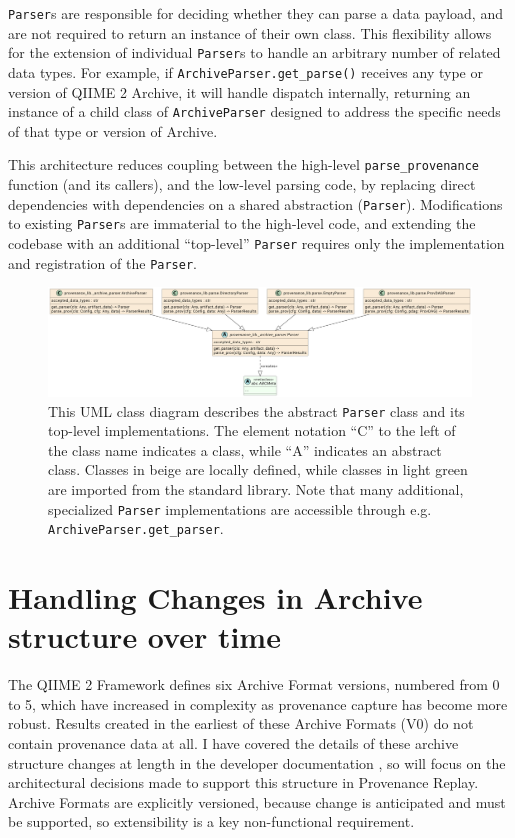 \texttt{Parser}s are responsible for deciding whether they can parse a data payload, and
are not required to return an instance of their own class. This flexibility
allows for the extension of individual \texttt{Parser}s to handle an arbitrary number of
related data types. For example, if \texttt{ArchiveParser.get\_parse()} receives any type
or version of QIIME 2 Archive, it will handle dispatch internally, returning an
instance of a child class of \texttt{ArchiveParser} designed to address the specific
needs of that type or version of Archive.

This architecture reduces coupling between the high-level \texttt{parse\_provenance}
function (and its callers), and the low-level parsing code, by replacing direct
dependencies with dependencies on a shared abstraction (\texttt{Parser}). Modifications
to existing \texttt{Parser}s are immaterial to the high-level code, and extending the
codebase with an additional “top-level” \texttt{Parser} requires only the implementation
and registration of the \texttt{Parser}. 

\begin{figure}[htp]
\centering
\includegraphics[width=\textwidth]{figures/allParsersUML.png}
\caption[UML Class diagram of the abstract Parser class and its implementations]%
{This UML class diagram describes the abstract \texttt{Parser} class and its top-level
implementations. The element notation “C” to the left of the class name
indicates a class, while “A” indicates an abstract class. Classes in beige are
locally defined, while classes in light green are imported from the standard
library. Note that many additional, specialized \texttt{Parser} implementations are
accessible through e.g. \texttt{ArchiveParser.get\_parser}.}
\label{fig:allParsersUML}
\end{figure}


\section{Handling Changes in Archive structure over time}

The QIIME 2 Framework defines six Archive Format versions, numbered from 0 to 5,
which have increased in complexity as provenance capture has become more robust.
Results created in the earliest of these Archive Formats (V0) do not contain
provenance data at all. I have covered the details of these archive structure
changes at length in the developer documentation \parencite{qiime_2_development_team_archive_2018},
so will focus on the architectural decisions made to support this structure in
Provenance Replay. Archive Formats are explicitly versioned, because change is
anticipated and must be supported, so extensibility is a key non-functional
requirement.

